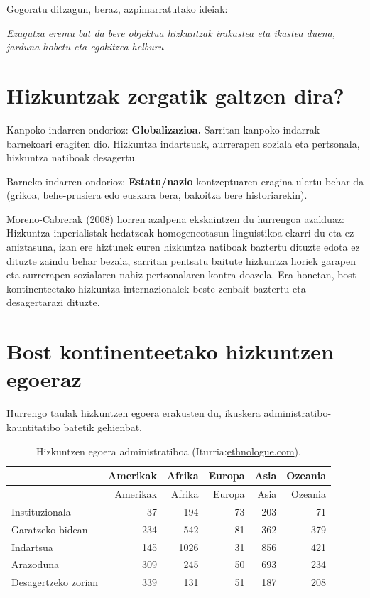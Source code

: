 \documentclass[
]{book}
\begin{document}
Gogoratu ditzagun, beraz, azpimarratutako ideiak:

\emph{Ezagutza eremu bat da bere objektua hizkuntzak irakastea eta ikastea duena, jarduna hobetu eta egokitzea helburu}

\hypertarget{hizkuntzak-zergatik-galtzen-dira}{%
\section{Hizkuntzak zergatik galtzen dira?}\label{hizkuntzak-zergatik-galtzen-dira}}

Kanpoko indarren ondorioz: \textbf{Globalizazioa.} Sarritan kanpoko indarrak barnekoari eragiten dio. Hizkuntza indartsuak, aurrerapen soziala eta pertsonala, hizkuntza natiboak desagertu.

Barneko indarren ondorioz: \textbf{Estatu/nazio} kontzeptuaren eragina ulertu behar da (grikoa, behe-prusiera edo euskara bera, bakoitza bere historiarekin).

Moreno-Cabrerak (2008) horren azalpena ekskaintzen du hurrengoa azalduaz: Hizkuntza inperialistak hedatzeak homogeneotasun linguistikoa ekarri du eta ez aniztasuna, izan ere hiztunek euren hizkuntza natiboak baztertu dituzte edota ez dituzte zaindu behar bezala, sarritan pentsatu baitute hizkuntza horiek garapen eta aurrerapen sozialaren nahiz pertsonalaren kontra doazela. Era honetan, bost kontinenteetako hizkuntza internazionalek beste zenbait baztertu eta desagertarazi dituzte.

\hypertarget{bost-kontinenteetako-hizkuntzen-egoeraz}{%
\section{Bost kontinenteetako hizkuntzen egoeraz}\label{bost-kontinenteetako-hizkuntzen-egoeraz}}

Hurrengo taulak hizkuntzen egoera erakusten du, ikuskera administratibo-kauntitatibo batetik gehienbat.

\begin{longtable}[]{@{}lrrrrr@{}}
\caption{Hizkuntzen egoera administratiboa (Iturria:\href{https://www.ethnologue.com/}{ethnologue.com}).}\tabularnewline
\toprule
& Amerikak & Afrika & Europa & Asia & Ozeania\tabularnewline
\midrule
\endfirsthead
\toprule
& Amerikak & Afrika & Europa & Asia & Ozeania\tabularnewline
\midrule
\endhead
Instituzionala & 37 & 194 & 73 & 203 & 71\tabularnewline
Garatzeko bidean & 234 & 542 & 81 & 362 & 379\tabularnewline
Indartsua & 145 & 1026 & 31 & 856 & 421\tabularnewline
Arazoduna & 309 & 245 & 50 & 693 & 234\tabularnewline
Desagertzeko zorian & 339 & 131 & 51 & 187 & 208\tabularnewline
\bottomrule
\end{longtable}
\end{document}
